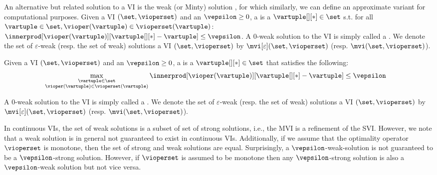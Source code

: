 An alternative but related solution to a VI is the weak (or Minty) solution \cite{minty1967generalization}, for which similarly, we can define an approximate variant for computational purposes. Given a VI $(\set, \vioperset)$ and an  $\vepsilon \geq 0$, a  is a $\vartuple[][*] \in \set$ s.t. for all $\vartuple \in \set, \vioper(\vartuple) \in \vioperset(\vartuple)$:
$\innerprod[{\vioper(\vartuple)}][{\vartuple[][*] - \vartuple}] \leq \vepsilon$.
A $0$-weak solution to the VI is simply called a . 
We denote the set of $\varepsilon$-weak (resp. the set of weak) solutions a VI $(\set, \vioperset)$ by $\mvi[\varepsilon](\set, \vioperset)$ (resp. $\mvi(\set, \vioperset)$).


\begin{definition}
    Given a VI $(\set, \vioperset)$ and an  $\vepsilon \geq 0$, a 
    is a $\vartuple[][*] \in \set$ that satisfies the following:
    \begin{align}
    &\max_{\substack{\vartuple \in \set\\ \vioper(\vartuple) \in \vioperset(\vartuple)}} \innerprod[{\vioper(\vartuple)}][{\vartuple[][*] - \vartuple}] \leq \vepsilon
    \end{align}

    A $0$-weak solution to the VI is simply called a . 
    We denote the set of $\varepsilon$-weak (resp. the set of weak) solutions a VI $(\set, \vioperset)$ by $\mvi[\varepsilon](\set, \vioperset)$ (resp. $\mvi(\set, \vioperset)$).
\end{definition}
\fi 

In continuous VIs, the set of weak solutions is a subset of set of strong solutions, i.e., the MVI is a refinement of the SVI. However, we note that a weak solution is in general not guaranteed to exist in continuous VIs.
Additionally, if we assume that the optimality operator $\vioperset$ is monotone, then the set of strong and weak solutions are equal. Surprisingly, a $\vepsilon$-weak-solution is not guaranteed to be a $\vepsilon$-strong solution. However, if $\vioperset$ is assumed to be monotone then any $\vepsilon$-strong solution is also a $\vepsilon$-weak solution but not vice versa. 

